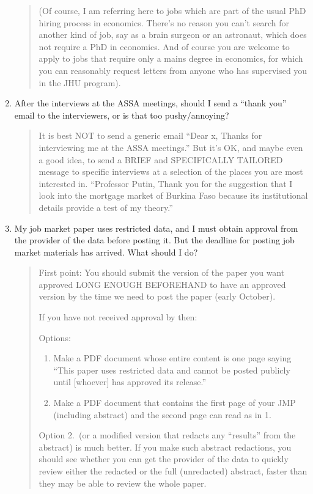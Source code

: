 \documentclass{\classes/econtex}
\begin{document}
\begin{enumerate}
\begin{quote}
    (Of course, I am referring here to jobs which are part of the usual PhD hiring 
    process in economics.  There's no reason you can't search for another kind of 
    job, say as a brain surgeon or an astronaut, which does not require a 
    PhD in economics.  And of course you are welcome to apply to jobs that require 
    only a mains degree in economics, for which you can reasonably request letters 
    from anyone who has supervised you in the JHU program).  

  \end{quote}

\item  After the interviews at the ASSA meetings, should I send a ``thank you'' email to the interviewers, or is that too pushy/annoying?
  \begin{quote}
    It is best NOT to send a generic email ``Dear x, Thanks for interviewing me at the ASSA meetings.''  But it's OK, and maybe even a good idea, to send a BRIEF and SPECIFICALLY TAILORED message to specific interviews at a selection of the places you are most interested in.  ``Professor Putin, Thank you for the suggestion that I look into the mortgage market of Burkina Faso because its institutional details provide a test of my theory.''

    \hypertarget{restricted-data}{}  
  \end{quote}

\item  My job market paper uses restricted data, and I must obtain approval from the provider of the data before posting it. But the deadline for posting job market materials has arrived. What should I do?

  \begin{quote}
    First point: You should submit the version of the paper you want approved LONG ENOUGH BEFOREHAND to have an approved version by the time we need to post the paper (early October).

    If you have not received approval by then:
    
      Options:
      \begin{enumerate}
      \item Make a PDF document whose entire content is one page saying ``This paper uses restricted data and cannot be posted publicly until [whoever] has approved its release.''
      \item Make a PDF document that contains the first page of your JMP (including abstract) and the second page can read as in 1.
      \end{enumerate}

    Option 2.\ (or a modified version that redacts any ``results'' from the abstract) is much better. If you make such abstract redactions, you should see whether you can get the provider of the data to quickly review either the redacted or the full (unredacted) abstract, faster than they may be able to review the whole paper.

  \end{quote}
\end{enumerate}
\end{document}
